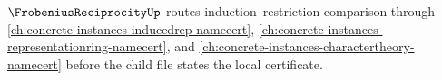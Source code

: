 $\FrobeniusReciprocityUp$ routes induction--restriction comparison through \autoref{ch:concrete-instances-inducedrep-namecert}, \autoref{ch:concrete-instances-representationring-namecert}, and \autoref{ch:concrete-instances-charactertheory-namecert} before the child file states the local certificate.


